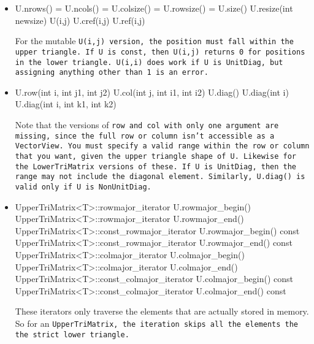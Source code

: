 \begin{itemize}

\item
\begin{tmvcode}
U.nrows() = U.ncols() = U.colsize() = U.rowsize() = U.size()
U.resize(int newsize)
U(i,j)
U.cref(i,j)
U.ref(i,j)
\end{tmvcode}
For the mutable \tt{U(i,j)} version, the position must fall within the
upper triangle.  If \tt{U} is \tt{const}, then \tt{U(i,j)} returns 0 for
positions in the lower triangle.
\tt{U(i,i)} does work if \tt{U} is \tt{UnitDiag}, but assigning anything
other than \tt{1} is an error.

\item
\begin{tmvcode}
U.row(int i, int j1, int j2)
U.col(int j, int i1, int i2)
U.diag()
U.diag(int i)
U.diag(int i, int k1, int k2)
\end{tmvcode}
Note that the versions of \tt{row} and \tt{col} with only one argument are
missing, since the full row or column isn't accessible as a \tt{VectorView}.
You must specify a valid range within the row or column that you want, 
given the upper triangle shape of \tt{U}.  Likewise for the \tt{LowerTriMatrix}
versions of these.
If \tt{U} is \tt{UnitDiag}, then the range may not include the diagonal element.
Similarly, \tt{U.diag()} is valid only if \tt{U} is \tt{NonUnitDiag}.

\item
\begin{tmvcode}
UpperTriMatrix<T>::rowmajor_iterator U.rowmajor_begin()
UpperTriMatrix<T>::rowmajor_iterator U.rowmajor_end()
UpperTriMatrix<T>::const_rowmajor_iterator U.rowmajor_begin() const
UpperTriMatrix<T>::const_rowmajor_iterator U.rowmajor_end() const
UpperTriMatrix<T>::colmajor_iterator U.colmajor_begin()
UpperTriMatrix<T>::colmajor_iterator U.colmajor_end()
UpperTriMatrix<T>::const_colmajor_iterator U.colmajor_begin() const
UpperTriMatrix<T>::const_colmajor_iterator U.colmajor_end() const
\end{tmvcode}
These iterators only traverse the elements that are actually stored in memory. So for an \tt{UpperTriMatrix}, the iteration skips all the elements the the strict lower triangle.


\end{itemize}
